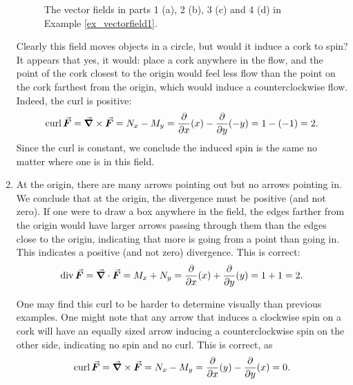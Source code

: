 \begin{example}
\begin{enumerate}
\begin{figure}[H]
\qquad
{}
\caption{The vector fields in parts 1 (a), 2 (b), 3 (c) and 4 (d) in Example \ref{ex_vectorfield1}.}
\end{figure}

		Clearly this field moves objects in a circle, but would it induce a cork to spin? It appears that yes, it would: place a cork anywhere in the flow, and the point of the cork closest to the origin would feel less flow than the point on the cork farthest from the origin, which would induce a counterclockwise flow. Indeed, the curl is positive:
	$$\curl \vec F = \vec{\nabla}\times\vec F = N_x-M_y = \frac{\partial}{\partial x}(x) - \frac{\partial}{\partial y}(-y) = 1-(-1) = 2.$$
	Since the curl is constant, we conclude the induced spin is the same no matter where one is in this field.
	
	\item At the origin, there are many arrows pointing out but no arrows pointing in. We conclude that at the origin, the divergence must be positive (and not zero). If one were to draw a box anywhere in the field, the edges farther from the origin would have larger arrows passing through them than the edges close to the origin, indicating that more is going from a point than going in. This indicates a positive (and not zero) divergence. This is correct:
	$$\divv\vec F = \vec{\nabla} \cdot \vec F = M_x + N_y = \frac{\partial}{\partial x}(x) + \frac{\partial}{\partial y}(y) = 1+1=2.$$
	
	One may find this curl to be harder to determine visually than previous examples. One might note that any arrow that induces a clockwise spin on a cork will have an equally sized arrow inducing a counterclockwise spin on the other side, indicating no spin and no curl. This is correct, as
	$$\curl \vec F = \vec{\nabla}\times\vec F = N_x-M_y = \frac{\partial}{\partial x}(y) - \frac{\partial}{\partial y}(x) = 0.$$
	


\end{enumerate}
\end{example}
